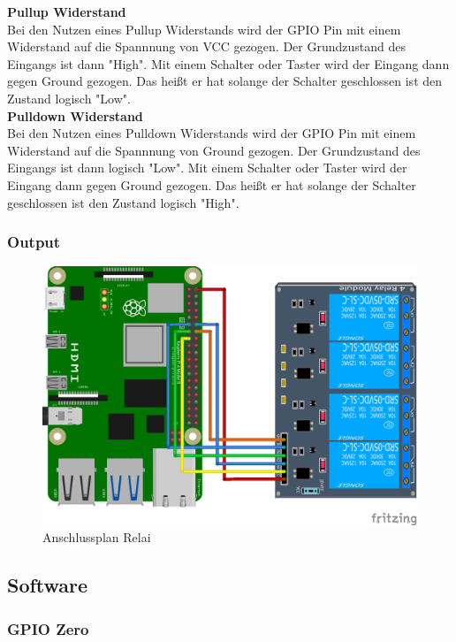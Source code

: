 \textbf{Pullup Widerstand}\\
Bei den Nutzen eines Pullup Widerstands wird der GPIO Pin mit einem Widerstand auf die Spannnung von VCC gezogen. Der Grundzustand des Eingangs ist dann "High". Mit einem Schalter oder Taster wird der Eingang dann gegen Ground gezogen. Das heißt er hat solange der Schalter geschlossen ist den Zustand logisch "Low".\\\medskip
\textbf{Pulldown Widerstand}\\
Bei den Nutzen eines Pulldown Widerstands wird der GPIO Pin mit einem Widerstand auf die Spannnung von Ground gezogen. Der Grundzustand des Eingangs ist dann logisch "Low". Mit einem Schalter oder Taster wird der Eingang dann gegen Ground gezogen. Das heißt er hat solange der Schalter geschlossen ist den Zustand logisch "High".

\subsubsection{Output}

\begin{figure}[H]
	\begin{center}
		\includegraphics[scale=0.8]{figures/hcis/4ch_relai.png}
			\caption{Anschlussplan Relai}
			\label{fig:output}
	\end{center}
\end{figure}

\subsection{Software}

\subsubsection{GPIO Zero}

